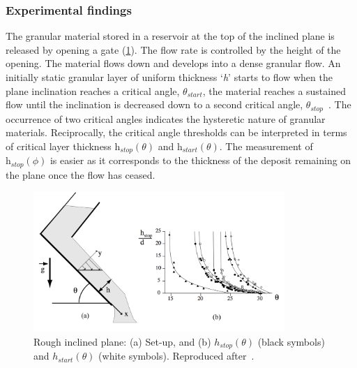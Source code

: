 \subsubsection{Experimental findings}

The granular material stored in a reservoir at the top of the inclined plane is 
released by opening a gate (\cref{fig:Incline}). The flow rate is controlled by 
the height of the opening. The material flows down and develops into a dense 
granular flow. An initially static granular layer of uniform thickness 
`\textit{h}' starts to flow when the plane inclination reaches a critical 
angle, $\theta_{\textit{start}}$, the material reaches a sustained flow until 
the inclination is decreased down to a second critical angle, 
$\theta_{\textit{stop}}$~\citep{Midi2004}. The occurrence of two critical 
angles indicates the hysteretic nature of granular materials. Reciprocally, the 
critical angle thresholds can be interpreted in terms of critical layer 
thickness $\textit{h}_{\textit{stop}}(\theta)$ and 
$\textit{h}_{\textit{start}}(\theta)$. The measurement of  
$\textit{h}_{\textit{stop}}(\phi)$ is easier as it corresponds to the thickness 
of the deposit remaining on the plane once the flow has ceased. 

\begin{figure}[tbhp]
\centering
\includegraphics[width=0.85\textwidth]{Incline}
\caption{Rough inclined plane: (a) Set-up, and (b) $h_{stop}(\theta)$ (black 
symbols) and $h_{start}(\theta)$ (white symbols). Reproduced 
after~\citep{Midi2004}.}
\label{fig:Incline}
\end{figure}


